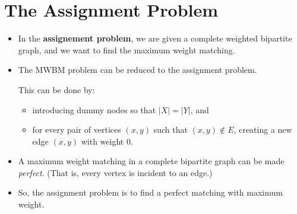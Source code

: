 \documentclass[10pt]{article}
\begin{document}
  \section{The Assignment Problem}
  \begin{itemize}
    \item In the {\bf assignement problem}, we are given a complete weighted bipartite graph, and we want to find the maximum weight matching.

    \item The MWBM problem can be reduced to the assignment problem.

    This can be done by:
    \begin{itemize}
       \item introducing dummy nodes so that $|X| = |Y|$, and
       \item for every pair of vertices $(x,y)$ such that $(x,y) \not\in E$, creating a new edge $(x,y)$ with weight $0$.
     \end{itemize} 

     \item A maximum weight matching in a complete bipartite graph can be made {\it perfect}. (That is, every vertex is incident to an edge.)

     \item So, the assignment problem is to find a perfect matching with maximum weight.
  \end{itemize}
\end{document}
